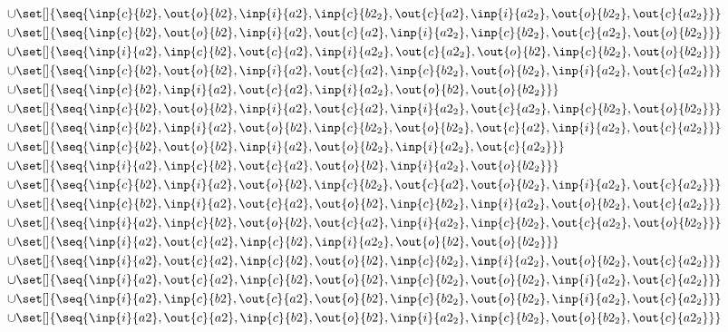 \begin{align*}
\cup&\set[]{\seq{\inp{c}{b2},\out{o}{b2},\inp{i}{a2},\inp{c}{b2_2},\out{c}{a2},\inp{i}{a2_2},\out{o}{b2_2},\out{c}{a2_2}}}\\
\cup&\set[]{\seq{\inp{c}{b2},\out{o}{b2},\inp{i}{a2},\out{c}{a2},\inp{i}{a2_2},\inp{c}{b2_2},\out{c}{a2_2},\out{o}{b2_2}}}\\
\cup&\set[]{\seq{\inp{i}{a2},\inp{c}{b2},\out{c}{a2},\inp{i}{a2_2},\out{c}{a2_2},\out{o}{b2},\inp{c}{b2_2},\out{o}{b2_2}}}\\
\cup&\set[]{\seq{\inp{c}{b2},\out{o}{b2},\inp{i}{a2},\out{c}{a2},\inp{c}{b2_2},\out{o}{b2_2},\inp{i}{a2_2},\out{c}{a2_2}}}\\
\cup&\set[]{\seq{\inp{c}{b2},\inp{i}{a2},\out{c}{a2},\inp{i}{a2_2},\out{o}{b2},\out{o}{b2_2}}}\\
\cup&\set[]{\seq{\inp{c}{b2},\out{o}{b2},\inp{i}{a2},\out{c}{a2},\inp{i}{a2_2},\out{c}{a2_2},\inp{c}{b2_2},\out{o}{b2_2}}}\\
\cup&\set[]{\seq{\inp{c}{b2},\inp{i}{a2},\out{o}{b2},\inp{c}{b2_2},\out{o}{b2_2},\out{c}{a2},\inp{i}{a2_2},\out{c}{a2_2}}}\\
\cup&\set[]{\seq{\inp{c}{b2},\out{o}{b2},\inp{i}{a2},\out{o}{b2_2},\inp{i}{a2_2},\out{c}{a2_2}}}\\
\cup&\set[]{\seq{\inp{i}{a2},\inp{c}{b2},\out{c}{a2},\out{o}{b2},\inp{i}{a2_2},\out{o}{b2_2}}}\\
\cup&\set[]{\seq{\inp{c}{b2},\inp{i}{a2},\out{o}{b2},\inp{c}{b2_2},\out{c}{a2},\out{o}{b2_2},\inp{i}{a2_2},\out{c}{a2_2}}}\\
\cup&\set[]{\seq{\inp{c}{b2},\inp{i}{a2},\out{c}{a2},\out{o}{b2},\inp{c}{b2_2},\inp{i}{a2_2},\out{o}{b2_2},\out{c}{a2_2}}}\\
\cup&\set[]{\seq{\inp{i}{a2},\inp{c}{b2},\out{o}{b2},\out{c}{a2},\inp{i}{a2_2},\inp{c}{b2_2},\out{c}{a2_2},\out{o}{b2_2}}}\\
\cup&\set[]{\seq{\inp{i}{a2},\out{c}{a2},\inp{c}{b2},\inp{i}{a2_2},\out{o}{b2},\out{o}{b2_2}}}\\
\cup&\set[]{\seq{\inp{i}{a2},\out{c}{a2},\inp{c}{b2},\out{o}{b2},\inp{c}{b2_2},\inp{i}{a2_2},\out{o}{b2_2},\out{c}{a2_2}}}\\
\cup&\set[]{\seq{\inp{i}{a2},\out{c}{a2},\inp{c}{b2},\out{o}{b2},\inp{c}{b2_2},\out{o}{b2_2},\inp{i}{a2_2},\out{c}{a2_2}}}\\
\cup&\set[]{\seq{\inp{i}{a2},\inp{c}{b2},\out{c}{a2},\out{o}{b2},\inp{c}{b2_2},\out{o}{b2_2},\inp{i}{a2_2},\out{c}{a2_2}}}\\
\cup&\set[]{\seq{\inp{i}{a2},\out{c}{a2},\inp{c}{b2},\out{o}{b2},\inp{i}{a2_2},\inp{c}{b2_2},\out{o}{b2_2},\out{c}{a2_2}}}\\

\end{align*}
